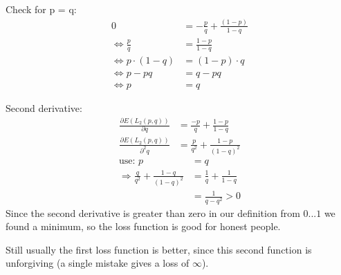 Check for p = q:
\begin{align*}
0 &= -\frac{p}{q} + \frac{\left(1 - p\right)}{1-q} \\
\Leftrightarrow \frac{p}{q} &= \frac{1-p}{1-q} \\
\Leftrightarrow p \cdot \left(1 - q\right) &= \left(1 - p\right) \cdot q \\
\Leftrightarrow p - pq &= q - pq \\
\Leftrightarrow p &= q
\end{align*}

Second derivative:
\begin{align*}
\frac{\partial E\left(L_2\left(p, q\right)\right)}{\partial q} &= \frac{-p}{q} + \frac{1-p}{1-q} \\
\frac{\partial E\left(L_2\left(p, q\right)\right)}{\partial^2 q} &= \frac{p}{q^2} + \frac{1-p}{\left(1-q\right)^2}
\end{align*}
\begin{align*}
\text{use: } p &= q\\
\Rightarrow \frac{q}{q^2} + \frac{1-q}{\left(1-q\right)^2} &= \frac{1}{q} + \frac{1}{1-q} \\
&= \frac{1}{q-q^2} > 0
\end{align*}
Since the second derivative is greater than zero in our definition from $0...1$ we found a minimum, so the loss function is good for honest people.

Still usually the first loss function is better, since this second function is unforgiving (a single mistake gives a loss of $\infty$).